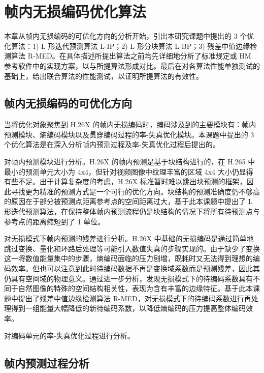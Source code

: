 \chapter{帧内无损编码优化算法}
\label{cha:c3}
本章从帧内无损编码的可优化方向的分析开始，引出本研究课题中提出的 3 个优化算法：1) L 形迭代预测算法 L-IP；2) L 形分块算法 L-BP；3) 残差中值边缘检测算法 R-MED。在具体描述所提出算法之前均先详细地分析了标准规定或 HM 参考软件中的实现方案，以与所提算法形成对比。最后在对各算法性能单独测试的基础上，给出联合算法的性能测试，以证明所提算法的有效性。

\section{帧内无损编码的可优化方向}
当将优化对象聚焦到 H.26X 的帧内无损编码时，编码涉及到的主要模块有：帧内预测模块、熵编码模块以及贯穿编码过程的率-失真优化模块。本课题中提出的 3 个优化算法是在深入分析帧内预测过程及率-失真优化过程后提出的。

对帧内预测模块进行分析。H.26X 的帧内预测是基于块结构进行的，在 H.265 中最小的预测单元大小为 4x4，但针对视频图像中纹理丰富的区域 4x4 大小仍显得有些不足。出于计算复杂度的考虑，H.26X 标准暂时难以跳出块预测的框架，因此寻找更为精准的预测方式是一个可行的优化方向。块结构的预测准确度仍不够高的原因在于部分被预测点距离参考点的空间距离过大，基于此本课题中提出了 L 形迭代预测算法，在保持整体帧内预测流程仍是块结构的情况下将所有待预测点与参考点的距离缩短到了 1 单位。

对无损模式下帧内预测的残差进行分析。H.26X 中基础的无损编码是通过简单地跳过变换、量化和环路后处理等可能引入数值失真的步骤实现的。由于缺少了变换这一将数值能量集中的步骤，熵编码面临的压力剧增，既耗时又无法得到理想的编码效率。但也可以注意到此时待编码数据不再是变换域系数而是预测残差，因此其仍具有空间域的物理意义。通过进一步分析，发现无损模式下的待编码系数具有不同于自然图像的特殊的空间结构相关性，表现为含有丰富的边缘特征。基于此本课题中提出了残差中值边缘检测算法 R-MED，对无损模式下的待编码系数进行再处理得到一组能量大幅降低的新待编码系数，以降低熵编码的压力提高整体编码效率。

对编码单元的率-失真优化过程进行分析。

\section{帧内预测过程分析}
\label{cha:IntraPredDetail}

